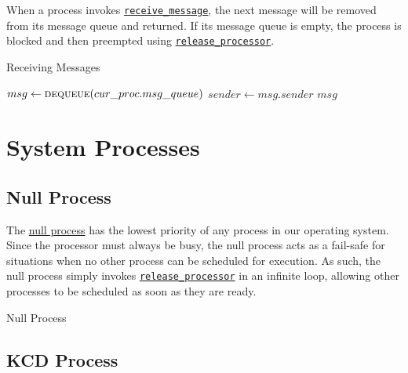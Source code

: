 \documentclass[12pt]{report}
\begin{document}
When a process invokes \hyperref[alg:receivingmessages]{\texttt{receive_message}}, the next message will be removed from its message queue and returned. If its message queue is empty, the process is blocked and then preempted using \hyperref[alg:releasingtheprocessor]{\texttt{release_processor}}.\\

\begin{algorithm}
\caption{Receiving Messages}
\label{alg:receivingmessages}
\begin{algorithmic}[1]
        \State {}
        \State {}
    \EndWhile
    \State $msg \leftarrow \Call{dequeue}{cur\_proc.msg\_queue}$
    \State $sender \leftarrow msg.sender$
    \State \Return $msg$
\EndProcedure
\end{algorithmic}
\end{algorithm}

\section{System Processes}

\subsection{Null Process}

The \hyperref[alg:nullprocess]{null process} has the lowest priority of any process in our operating system. Since the processor must always be busy, the null process acts as a fail­-safe for situations when no other process can be scheduled for execution. As such, the null process simply invokes \hyperref[alg:releasingtheprocessor]{\texttt{release_processor}} in an infinite loop, allowing other processes to be scheduled as soon as they are ready.\\

\begin{algorithm}
\caption{Null Process}
\label{alg:nullprocess}
\begin{algorithmic}[1]
        \State {}
    \EndWhile
\EndProcedure
\end{algorithmic}
\end{algorithm}

\subsection{KCD Process}
\end{document}
